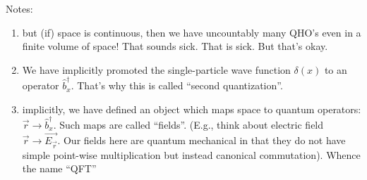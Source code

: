 Notes:
\begin{enumerate}
    \item but (if) space is continuous, then we have uncountably many QHO's even in a finite volume of space! That sounds sick. That is sick. But that's okay.
    \item We have implicitly promoted the single-particle wave function $\delta(x)$ to an operator $\hat{b}_x^\dagger$. That's why this is called ``second quantization''.
    \item implicitly, we have defined an object which maps space to quantum operators: $\vec{r}\to \hat{b}_x^\dagger$. Such maps are called ``fields''. (E.g., think about electric field $\vec{r}\to \vec{E_{\vec{r}}}$. Our fields here are quantum mechanical in that they do not have simple point-wise multiplication but instead canonical commutation). Whence the name ``QFT''
\end{enumerate}

